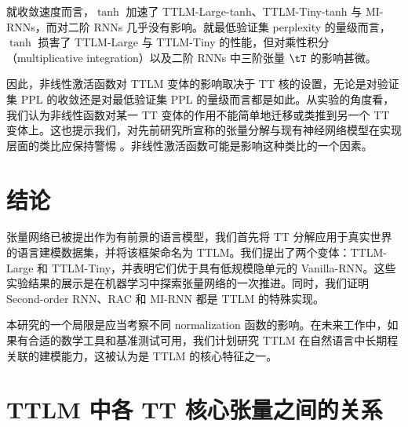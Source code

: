 \documentclass{article}
\newcommand{\benyou}[1]{{\bf \color{blue} [[benyou says ``#1'']]}}
\theoremstyle{plain}
\theoremstyle{definition}
\theoremstyle{remark}
\begin{document}
就收敛速度而言，$\tanh$ 加速了 TTLM-Large-tanh、TTLM-Tiny-tanh 与 MI-RNNs，而对二阶 RNNs 几乎没有影响。就最低验证集 perplexity 的量级而言，$\tanh$ 损害了 TTLM-Large 与 TTLM-Tiny 的性能，但对乘性积分（multiplicative integration）以及二阶 RNNs 中三阶张量 $\tT$ 的影响甚微。

因此，非线性激活函数对 TTLM 变体的影响取决于 TT 核的设置，无论是对验证集 PPL 的收敛还是对最低验证集 PPL 的量级而言都是如此。从实验的角度看，我们认为非线性函数对某一 TT 变体的作用不能简单地迁移或类推到另一个 TT 变体上。这也提示我们，对先前研究所宣称的张量分解与现有神经网络模型在实现层面的类比应保持警惕 \citep{khrulkov2018expressive, levine2018benefits}。非线性激活函数可能是影响这种类比的一个因素。

\section{结论}

张量网络已被提出作为有前景的语言模型，我们首先将 TT 分解应用于真实世界的语言建模数据集，并将该框架命名为 TTLM。我们提出了两个变体：TTLM-Large 和 TTLM-Tiny，并表明它们优于具有低规模隐单元的 Vanilla-RNN。这些实验结果的展示是在机器学习中探索张量网络的一次推进。同时，我们证明 Second-order RNN、RAC 和 MI-RNN 都是 TTLM 的特殊实现。

本研究的一个局限是应当考察不同 normalization 函数的影响。在未来工作中，如果有合适的数学工具和基准测试可用，我们计划研究 TTLM 在自然语言中长期程关联的建模能力，这被认为是 TTLM 的核心特征之一。





















\newpage
\appendix
\onecolumn

\section{TTLM 中各 TT 核心张量之间的关系}
\label{sec: relationship}
\end{document}
